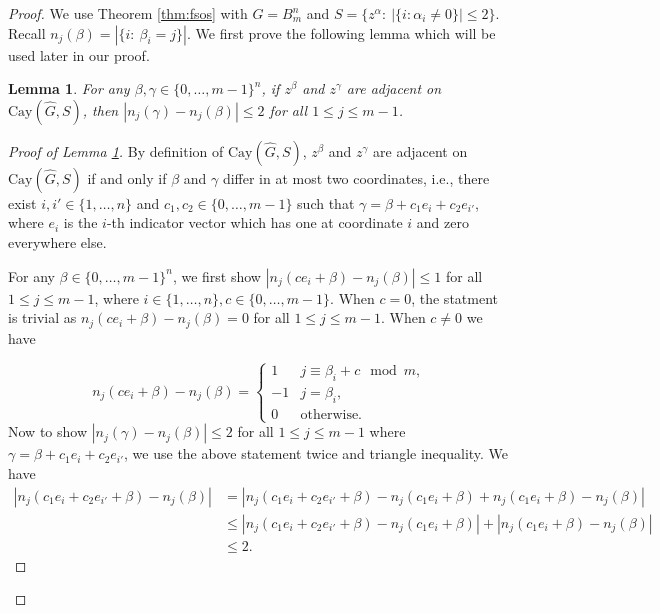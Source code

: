 \documentclass{article}
\newtheorem{lemma}{Lemma}
\theoremstyle{definition}
\begin{document}
\begin{proof}
    We use Theorem \ref{thm:fsos} with $G=B_m^n$ and $S=\{z^\alpha:~ |\{i:\alpha_i\ne 0\}|\le 2\}$. Recall $n_j(\beta)=|\{i:~\beta_i=j\}|$. We first prove the following lemma which will be used later in our proof. 

    \begin{lemma}\label{lem:Cay-adjacent}
        For any $\beta,\gamma\in\{0,\ldots,m-1\}^n$, if $z^\beta$ and $z^\gamma$ are adjacent on $\text{Cay}(\hat{G},S)$, then $|n_j(\gamma)-n_j(\beta)|\le 2$ for all $1\le j\le m-1$. 
    \end{lemma}
    \begin{proof}[Proof of Lemma \ref{lem:Cay-adjacent}]
    By definition of $\text{Cay}(\hat{G},S)$, $z^\beta$ and $z^\gamma$ are adjacent on $\text{Cay}(\hat{G},S)$ if and only if $\beta$ and $\gamma$ differ in at most two coordinates, i.e., there exist $i,i'\in \{1,\ldots,n\}$ and $c_1,c_2\in \{0,\ldots,m-1\}$ such that $\gamma=\beta+c_1e_i+c_2e_{i'}$, where $e_i$ is the $i$-th indicator vector which has one at coordinate $i$ and zero everywhere else. 

    For any $\beta\in \{0,\ldots,m-1\}^n$, we first show $|n_j(ce_i+\beta)-n_j(\beta)|\le 1$ for all $1\le j\le m-1$, where $i\in \{1,\ldots,n\},c\in \{0,\ldots,m-1\}$. When $c = 0$, the statment is trivial as $n_j(ce_i+\beta)-n_j(\beta) = 0$ for all $1\le j\le m-1$. When $c\ne 0$ we have
    

    \begin{equation*}
        n_j(ce_i+\beta)-n_j(\beta)=\begin{cases}
            1 & j\equiv \beta_i+c\mod m,\\
            -1 & j=\beta_i,\\
            0 & \text{otherwise.}
        \end{cases}
    \end{equation*}
    Now to show $|n_j(\gamma)-n_j(\beta)|\le 2$ for all $1\le j\le m-1$ where $\gamma=\beta+c_1e_i+c_2e_{i'}$, we use the above statement twice and triangle inequality. We have
    \begin{equation*}
        \begin{aligned}
            |n_j(c_1e_i+c_2e_{i'}+\beta)-n_j(\beta)| & = |n_j(c_1e_i+c_2e_{i'}+\beta)-n_j(c_1e_i+\beta) + n_j(c_1e_i+\beta)-n_j(\beta)|\\
            & \le |n_j(c_1e_i+c_2e_{i'}+\beta)-n_j(c_1e_i+\beta)|+|n_j(c_1e_i+\beta)-n_j(\beta)| \\
            & \le 2.
        \end{aligned}
    \end{equation*}


\end{proof}
\end{proof}
\end{document}
